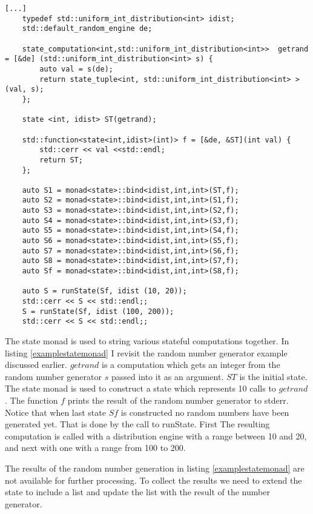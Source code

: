 \documentclass[12pt,fleqn]{article}
\begin{document}
%
%
%
\begin{minipage}{\linewidth}
\begin{lstlisting}[caption=example of the state monad, label=examplestatemonad]
[...]
	typedef std::uniform_int_distribution<int> idist;
	std::default_random_engine de;

	state_computation<int,std::uniform_int_distribution<int>>  getrand = [&de] (std::uniform_int_distribution<int> s) {
		auto val = s(de);
		return state_tuple<int, std::uniform_int_distribution<int> >(val, s);
	}; 

	state <int, idist> ST(getrand);
	
	std::function<state<int,idist>(int)> f = [&de, &ST](int val) {
		std::cerr << val <<std::endl; 
		return ST;
	};

	auto S1 = monad<state>::bind<idist,int,int>(ST,f);
	auto S2 = monad<state>::bind<idist,int,int>(S1,f);
	auto S3 = monad<state>::bind<idist,int,int>(S2,f);
	auto S4 = monad<state>::bind<idist,int,int>(S3,f);
	auto S5 = monad<state>::bind<idist,int,int>(S4,f);
	auto S6 = monad<state>::bind<idist,int,int>(S5,f);
	auto S7 = monad<state>::bind<idist,int,int>(S6,f);
	auto S8 = monad<state>::bind<idist,int,int>(S7,f);
	auto Sf = monad<state>::bind<idist,int,int>(S8,f);

    auto S = runState(Sf, idist (10, 20));
	std::cerr << S << std::endl;;
	S = runState(Sf, idist (100, 200));
	std::cerr << S << std::endl;;

\end{lstlisting}
\end{minipage}
%
%
%
  

The state monad is used to string various stateful computations together. 
In listing \ref{examplestatemonad} I revisit the random number generator example discussed earlier.
$getrand$ is a computation which gets an integer from the random number generator $s$ passed into it as an argument.
$ST$ is the initial state. The state monad is used to construct a state which represents 10 calls to $getrand$.
The function $f$ prints the result of the random number generator to stderr.
Notice that when last state $Sf$ is constructed no random numbers have been generated yet.
That is done by the call to runState.
First The resulting computation is called with a distribution engine with a range between 10 and 20, and next with one with a range from 100 to 200.

The results of the random number generation in listing \ref{examplestatemonad} are not available for further processing.
To collect the results we need to extend the state to include a list and update the list with the result of the number generator.
\end{document}
